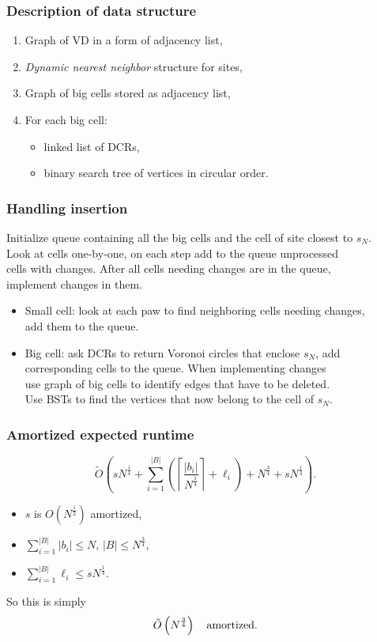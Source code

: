 \def\mitem{\medskip\item}
\begin{frame} \frametitle{Description of data structure}
\begin{enumerate}
	\item Graph of VD in a form of adjacency list,
	\mitem {\it Dynamic nearest neighbor} structure for sites,
	\mitem Graph of big cells stored as adjacency list,
	\mitem For each big cell: \begin{itemize}
	     \mitem linked list of DCRs,
	     \mitem binary search tree of vertices in circular order.
	\end{itemize}
\end{enumerate}
\end{frame}

\begin{frame} \frametitle{Handling insertion}
\begin{block}{\vspace*{-3ex}}
	Initialize queue containing all the big cells and the cell of site closest to $s_N$. \\
	Look at cells one-by-one, on each step add to the queue unprocessed \\
	cells with changes. After all cells needing changes are in the queue, \\
	implement changes in them.
\end{block} \bigskip

\begin{itemize}
	\item Small cell: look at each paw to find neighboring cells needing changes, \\
	    add them to the queue.
	\mitem Big cell: ask DCRs to return Voronoi circles that enclose $s_N$, add
	    corresponding cells to the queue. When implementing changes \\
	    use graph of big cells to identify edges that have to be deleted. \\
	    Use BSTs to find the vertices that now belong to the cell of $s_N$.
\end{itemize} \vspace{7.5mm}
\end{frame}

\def\lrp#1{\left( #1 \right)}
\def\lrc#1{\left\lceil#1\right\rceil}

\begin{frame} \frametitle{Amortized expected runtime}
\def\otl{$\Ot(1)$ } \def\Ot{\tilde O}
\newcommand{\nof}{N^\frac{1}{4}}
\newcommand{\noh}{N^\frac{1}{2}}
\newcommand{\ntf}{N^\frac{3}{4}}

{\small $$
\Ot \lrp{
s\nof +
\sum_{i=1}^{|B|}  \lrp{ \lrc{\frac{|b_i|}{\nof }}+\ell_i}
+ \ntf + s\nof
}.
$$}

\begin{itemize}
	\item $s$ is $O(\noh)$ amortized\hfill{},
	\mitem $\sum_{i=1}^{|B|} |b_i| \leq N$, $|B|\leq \ntf$,
	\mitem $\sum_{i=1}^{|B|} \ell_i \leq s \nof$.
\end{itemize} \bigskip

So this is simply {\large $$\Ot\ll\ntf\rr\quad\text{amortized.}$$}
\vspace{5mm}
\end{frame}